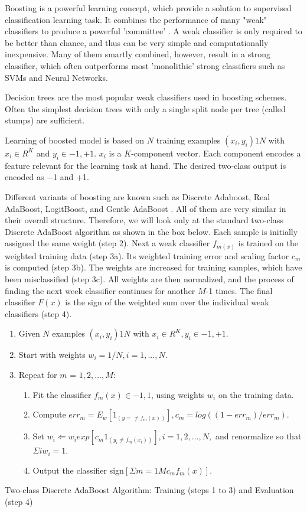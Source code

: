 Boosting is a powerful learning concept, which provide a solution to supervised classification learning task. It combines the performance of many "weak" classifiers to produce a powerful 'committee' . A weak classifier is only required to be better than chance, and thus can be very simple and computationally inexpensive. Many of them smartly combined, however, result in a strong classifier, which often outperforms most 'monolithic' strong classifiers such as SVMs and Neural Networks.

Decision trees are the most popular weak classifiers used in boosting schemes. Often the simplest decision trees with only a single split node per tree (called stumps) are sufficient.

Learning of boosted model is based on $N$ training examples ${(x_i,y_i)}1N$ with $x_i \in{R^K}$ and $y_i \in{-1, +1}$. $x_i$ is a $K$-component vector. Each component encodes a feature relevant for the learning task at hand. The desired two-class output is encoded as −1 and +1.

Different variants of boosting are known such as Discrete Adaboost, Real AdaBoost, LogitBoost, and Gentle AdaBoost . All of them are very similar in their overall structure. Therefore, we will look only at the standard two-class Discrete AdaBoost algorithm as shown in the box below. Each sample is initially assigned the same weight (step 2). Next a weak classifier $f_{m(x)}$ is trained on the weighted training data (step 3a). Its weighted training error and scaling factor $c_m$ is computed (step 3b). The weights are increased for training samples, which have been misclassified (step 3c). All weights are then normalized, and the process of finding the next week classifier continues for another $M$-1 times. The final classifier $F(x)$ is the sign of the weighted sum over the individual weak classifiers (step 4).
\begin{enumerate}
\item{Given $N$ examples ${(x_i,y_i)}1N$ with $x_i \in{R^K}, y_i \in{-1, +1}$.}
\item{Start with weights $w_i = 1/N, i = 1,...,N$.}
\item{Repeat for $m$ = $1,2,...,M$:
\begin{enumerate}
\item{Fit the classifier $f_m(x) \in{-1,1}$, using weights $w_i$ on the training data.}
\item{Compute $err_m = E_w [1_{(y =\neq f_m(x))}], c_m = log((1 - err_m)/err_m)$.}
\item{Set $w_i \Leftarrow w_i exp[c_m 1_{(y_i \neq f_m(x_i))}], i = 1,2,…,N,$ and renormalize so that $\Sigma i w_i = 1$.}
\item{Output the classifier sign$[\Sigma m = 1M c_m f_m(x)]$.}
\end{enumerate}}
\end{enumerate}
  Two-class Discrete AdaBoost Algorithm: Training (steps 1 to 3) and Evaluation (step 4)

